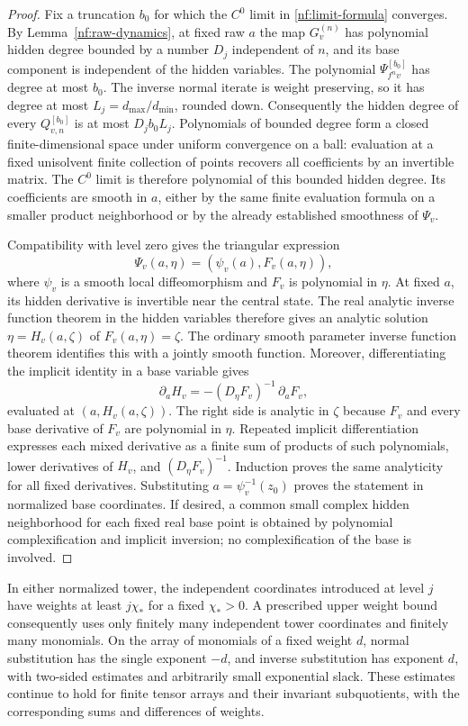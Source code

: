 \begin{proof}
Fix a truncation $b_0$ for which the $C^0$ limit in
\eqref{nf:limit-formula} converges.  By
Lemma~\ref{nf:raw-dynamics}, at fixed raw $a$ the map
$G_v^{(n)}$ has polynomial hidden degree bounded by a number $D_j$
independent of $n$, and its base component is independent of the
hidden variables.  The polynomial $\Psi_{f^nv}^{[b_0]}$ has degree
at most $b_0$.  The inverse normal iterate is weight preserving,
so it has degree at most $L_j=d_{\max}/d_{\min}$, rounded down.
Consequently the hidden degree of every $Q_{v,n}^{[b_0]}$ is at
most $D_jb_0L_j$.  Polynomials of bounded degree form a closed
finite-dimensional space under uniform convergence on a ball:
evaluation at a fixed unisolvent finite collection of points
recovers all coefficients by an invertible matrix.  The $C^0$
limit is therefore polynomial of this bounded hidden degree.
Its coefficients are smooth in $a$, either by the same finite
evaluation formula on a smaller product neighborhood or by the
already established smoothness of $\Psi_v$.

Compatibility with level zero gives the triangular expression
\[
 \Psi_v(a,\eta)=(\psi_v(a),F_v(a,\eta)),
\]
where $\psi_v$ is a smooth local diffeomorphism and $F_v$ is
polynomial in $\eta$.  At fixed $a$, its hidden derivative is
invertible near the central state.  The real analytic inverse
function theorem in the hidden variables therefore gives an
analytic solution $\eta=H_v(a,\zeta)$ of
$F_v(a,\eta)=\zeta$.  The ordinary smooth parameter inverse
function theorem identifies this with a jointly smooth function.
Moreover, differentiating the implicit identity in a base variable
gives
\[
 \partial_aH_v
 =-(D_\eta F_v)^{-1}\,\partial_aF_v,
\]
evaluated at $(a,H_v(a,\zeta))$.  The right side is analytic in
$\zeta$ because $F_v$ and every base derivative of $F_v$ are
polynomial in $\eta$.  Repeated implicit differentiation expresses
each mixed derivative as a finite sum of products of such
polynomials, lower derivatives of $H_v$, and
$(D_\eta F_v)^{-1}$.  Induction proves the same analyticity for all
fixed derivatives.  Substituting $a=\psi_v^{-1}(z_0)$ proves the
statement in normalized base coordinates.  If desired, a common
small complex hidden neighborhood for each fixed real base point
is obtained by polynomial complexification and implicit inversion;
no complexification of the base is involved.
\end{proof}

\begin{corollary}
\label{nf:finite-weight}
In either normalized tower, the independent coordinates introduced
at level $j$ have weights at least $j\chi_*$ for a fixed
$\chi_*>0$.  A prescribed upper weight bound consequently uses
only finitely many independent tower coordinates and finitely many
monomials.  On the array of monomials of a fixed weight $d$,
normal substitution has the single exponent $-d$, and inverse
substitution has exponent $d$, with two-sided estimates and
arbitrarily small exponential slack.  These estimates continue to
hold for finite tensor arrays and their invariant subquotients,
with the corresponding sums and differences of weights.
\end{corollary}

